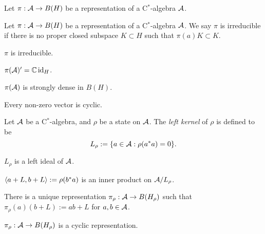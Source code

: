 \documentclass{../../large}
\begin{document}
\begin{prb}
Let $\pi:\mathcal{A}\to B(H)$ be a representation of a C$^*$-algebra $\mathcal{A}$.
\begin{parts}
\item
\end{parts}
\end{prb}

\begin{prb}
Let $\pi:\mathcal{A}\to B(H)$ be a representation of a C$^*$-algebra $\mathcal{A}$.
We say $\pi$ is irreducible if there is no proper closed subspace $K\subset H$ such that $\pi(a)K\subset K$.
\begin{parts}
\item $\pi$ is irreducible.
\item $\pi(\mathcal{A})'=\mathbb{C}\operatorname{id}_H$.
\item $\pi(\mathcal{A})$ is strongly dense in $B(H)$.
\item Every non-zero vector is cyclic.
\end{parts}
\end{prb}

\begin{prb}
Let $\mathcal{A}$ be a C$^*$-algebra, and $\rho$ be a state on $\mathcal{A}$.
The \emph{left kernel} of $\rho$ is defined to be
\[L_\rho:=\{a\in\mathcal{A}:\rho(a^*a)=0\}.\]
\begin{parts}
\item $L_\rho$ is a left ideal of $\mathcal{A}$.
\item $\langle a+L,b+L\rangle:=\rho(b^*a)$ is an inner product on $\mathcal{A}/L_\rho$.
\item There is a unique representation $\pi_\rho:\mathcal{A}\to B(H_\rho)$ such that $\pi_\rho(a)(b+L):=ab+L$ for $a,b\in\mathcal{A}$.
\item $\pi_\rho:\mathcal{A}\to B(H_\rho)$ is a cyclic representation.
\end{parts}
\end{prb}




\begin{prb}
\end{prb}

\begin{prb}
\end{prb}

\begin{prb}
\end{prb}

\begin{prb}
\end{prb}
\end{document}
